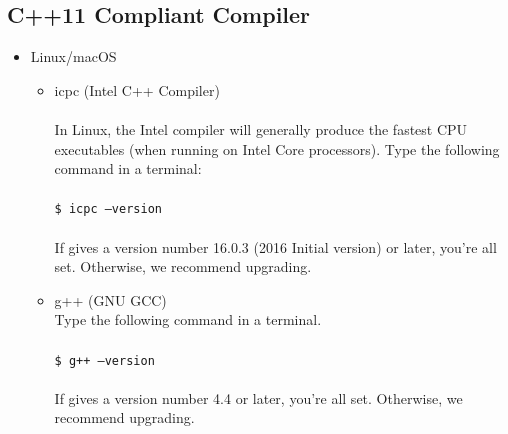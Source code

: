 \subsection{C++11 Compliant Compiler}
\begin{itemize}
	\item Linux/macOS
	\begin{itemize}
	\item icpc (Intel C++ Compiler)\\\\
		In Linux, the Intel compiler will generally produce the fastest CPU executables 
		(when running on Intel Core processors). Type the following command in a terminal: \\\\
		\texttt{\$ icpc --version} \\\\
		If gives a version number 16.0.3 (2016 Initial version) or later, you're all set. Otherwise, 
		we recommend upgrading. \\
	\item g++ (GNU GCC) \\
		Type the following command in a terminal.\\\\
		\texttt{\$ g++ --version}\\\\
		If gives a version number 4.4 or later, you're all set. Otherwise, we recommend 
		upgrading.\\
	\end{itemize}


\end{itemize}
